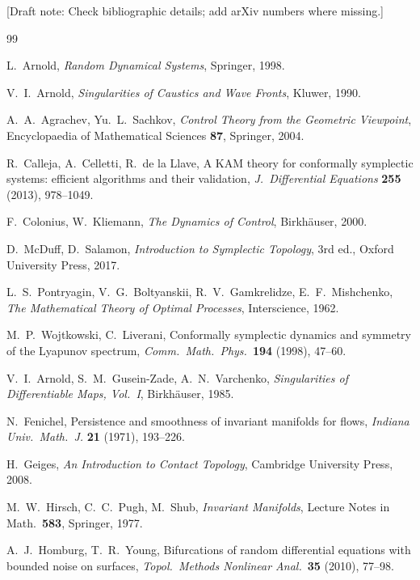 \documentclass[11pt,a4paper]{article}
\newif\ifdraftnotes \draftnotestrue
\newcommand{\note}[1]{\ifdraftnotes{\color{BrickRed}\textsf{\footnotesize[Draft note: #1]}}\fi}
\theoremstyle{definition}
\theoremstyle{remark}
\begin{document}
\note{Check bibliographic details; add arXiv numbers where missing.}
\begin{thebibliography}{99}\small

 L.~Arnold, \emph{Random Dynamical Systems}, Springer, 1998.

 V.~I.~Arnold, \emph{Singularities of Caustics and Wave Fronts}, Kluwer, 1990.

 A.~A.~Agrachev, Yu.~L.~Sachkov, \emph{Control Theory from the Geometric Viewpoint}, Encyclopaedia of
Mathematical Sciences \textbf{87}, Springer, 2004.

 R.~Calleja, A.~Celletti, R.~de la Llave, A KAM theory for conformally symplectic systems: efficient
algorithms and their validation, \emph{J.\ Differential Equations} \textbf{255} (2013), 978--1049.

 F.~Colonius, W.~Kliemann, \emph{The Dynamics of Control}, Birkh\"auser, 2000.

 D.~McDuff, D.~Salamon, \emph{Introduction to Symplectic Topology}, 3rd ed., Oxford University Press, 2017.

 L.~S.~Pontryagin, V.~G.~Boltyanskii, R.~V.~Gamkrelidze, E.~F.~Mishchenko, \emph{The Mathematical Theory of
Optimal Processes}, Interscience, 1962.

 M.~P.~Wojtkowski, C.~Liverani, Conformally symplectic dynamics and symmetry of the Lyapunov spectrum,
\emph{Comm.\ Math.\ Phys.}\ \textbf{194} (1998), 47--60.

 V.~I.~Arnold, S.~M.~Gusein-Zade, A.~N.~Varchenko, \emph{Singularities of Differentiable Maps, Vol.~I},
Birkh\"auser, 1985.

 N.~Fenichel, Persistence and smoothness of invariant manifolds for flows, \emph{Indiana Univ.\ Math.\ J.}
\textbf{21} (1971), 193--226.

 H.~Geiges, \emph{An Introduction to Contact Topology}, Cambridge University Press, 2008.

 M.~W.~Hirsch, C.~C.~Pugh, M.~Shub, \emph{Invariant Manifolds}, Lecture Notes in Math.\ \textbf{583},
Springer, 1977.

 A.~J.~Homburg, T.~R.~Young, Bifurcations of random differential equations with bounded noise on surfaces,
\emph{Topol.\ Methods Nonlinear Anal.}\ \textbf{35} (2010), 77--98.


\end{thebibliography}
\end{document}
